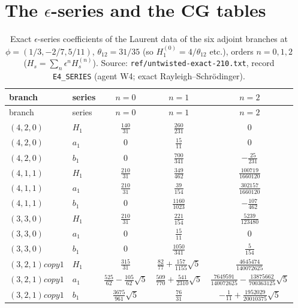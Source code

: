 \documentclass[11pt]{article}
\begin{document}
\section{The \texorpdfstring{$\epsilon$}{}-series and the CG tables}\label{app:D}

{\scriptsize
\begin{longtable}{llccc}
\caption{Exact $\epsilon$-series coefficients of the Laurent data of the six adjoint branches at $\phi=(1/3,-2/7,5/11)$, $\theta_{12}=31/35$ (so $H_1^{(0)}=4/\theta_{12}$ etc.), orders $n=0,1,2$ ($H_s=\sum_n\epsilon^nH_s^{(n)}$).
Source: \texttt{ref/\allowbreak{}untwisted-\allowbreak{}exact-\allowbreak{}210.\allowbreak{}txt}, record \texttt{E4\_\allowbreak{}SERIES} (agent W4; exact Rayleigh--Schr\"odinger).}\label{tab:series-ex}\\
\toprule
branch & series & $n=0$ & $n=1$ & $n=2$ \\
\midrule
\endfirsthead
\toprule
branch & series & $n=0$ & $n=1$ & $n=2$ \\
\midrule
\endhead
\bottomrule
\endlastfoot
$(4,2,0)$ & $H_1$ & $\frac{140}{31}$ & $\frac{260}{231}$ & 0 \\
$(4,2,0)$ & $a_1$ & 0 & $\frac{15}{11}$ & 0 \\
$(4,2,0)$ & $b_1$ & 0 & $\frac{700}{341}$ & $-\frac{25}{231}$ \\
$(4,1,1)$ & $H_1$ & $\frac{210}{31}$ & $\frac{349}{462}$ & $\frac{100719}{1660120}$ \\
$(4,1,1)$ & $a_1$ & $\frac{210}{31}$ & $\frac{39}{154}$ & $\frac{302157}{1660120}$ \\
$(4,1,1)$ & $b_1$ & 0 & $\frac{1160}{1023}$ & $-\frac{107}{462}$ \\
$(3,3,0)$ & $H_1$ & $\frac{210}{31}$ & $\frac{221}{154}$ & $\frac{5239}{123480}$ \\
$(3,3,0)$ & $a_1$ & 0 & $\frac{15}{11}$ & 0 \\
$(3,3,0)$ & $b_1$ & 0 & $\frac{1050}{341}$ & $\frac{5}{154}$ \\
$(3,2,1) copy 1$ & $H_1$ & $\frac{315}{31}$ & $\frac{82}{77}+\frac{157}{1155}\sqrt{5}$ & $\frac{4645474}{140072625}$ \\
$(3,2,1) copy 1$ & $a_1$ & $\frac{525}{62}-\frac{105}{62}\sqrt{5}$ & $\frac{509}{770}+\frac{541}{2310}\sqrt{5}$ & $\frac{7649591}{140072625}-\frac{13875662}{700363125}\sqrt{5}$ \\
$(3,2,1) copy 1$ & $b_1$ & $\frac{3675}{961}\sqrt{5}$ & $\frac{76}{31}$ & $-\frac{1}{11}+\frac{1952029}{20010375}\sqrt{5}$ \\

\end{longtable}}
\end{document}
